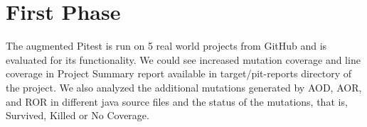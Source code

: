 \section{First Phase}





The augmented Pitest is run on 5 real world projects from GitHub and is evaluated for its functionality.
We could see increased mutation coverage and line coverage in Project Summary report available in target/pit-reports directory of the project.
We also analyzed the additional mutations generated by AOD, AOR, and ROR in different java source files and the status of the mutations, that is, Survived, Killed or No Coverage.
